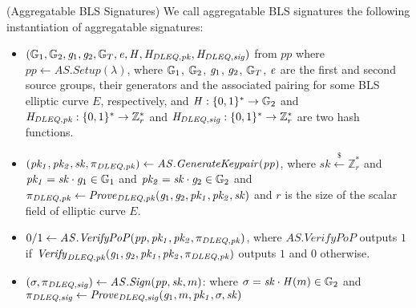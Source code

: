 \begin{construction}(Aggregatable BLS Signatures) We call aggregatable BLS signatures the following instantiation of aggregatable signatures:
\label{insta_bls}
\begin{itemize}
\item $(\mathbb{G}_{1}, \mathbb{G}_{2},  \mathit{g}_{1}, \mathit{g}_{2}, \mathbb{G}_{T}, \mathit{e}, \mathit{H}, \mathit{H}_{\mathit{DLEQ}, \mathit{pk}}, \mathit{H}_{\mathit{DLEQ}, \mathit{sig}})$ from $\mathit{pp}$ where 
$\mathit{pp} \leftarrow  \mathit{AS.Setup}(\lambda)$, 
where $\mathbb{G}_{1}$, $\mathbb{G}_{2}$,  $\mathit{g}_{1}$, $\mathit{g}_{2}$, $\mathbb{G}_{T}$, $\mathit{e}$ are the first and second source groups, their generators and the 
associated pairing for some BLS elliptic curve $E$, respectively,  %
and $\mathit{H}: \{0,1\}^* \rightarrow \mathbb{G}_{2}$ and $\mathit{H}_{\mathit{DLEQ}, \mathit{pk}}: \{0,1\}^* \rightarrow \mathbb{Z}_r^*$ and $\mathit{H}_{\mathit{DLEQ}, \mathit{sig}}: \{0,1\}^* \rightarrow \mathbb{Z}_r^*$
are two hash functions. 

\item $(\mathit{pk_1}, \mathit{pk_2}, \mathit{sk}, \pi_{\mathit{DLEQ}, \mathit{pk}}) \leftarrow \mathit{AS.GenerateKeypair}(\mathit{pp})$, 
where $\mathit{sk} \xleftarrow{\$} \mathbb{Z}_{r}^{*}$ and $\mathit{pk_1} = \mathit{sk} \cdot \mathit{g}_{1} \in \mathbb{G}_{1}$ 
and $\mathit{pk_2} = \mathit{sk} \cdot \mathit{g}_{2} \in \mathbb{G}_{2}$ 
and \\ $\pi_{\mathit{DLEQ}, \mathit{pk}} \leftarrow \mathit{Prove}_{\mathit{DLEQ}, \mathit{pk}}(\mathit{g}_{1}, \mathit{g}_{2}, \mathit{pk_1}, \mathit{pk_2}, \mathit{sk})$ 
and $r$ is the size of the scalar field of elliptic curve $E$. 

\item $0/1 \leftarrow \mathit{AS.VerifyPoP}(\mathit{pp}, \mathit{pk_1}, \mathit{pk_2}, \pi_{\mathit{DLEQ}, \mathit{pk}})$, where $\mathit{AS.VerifyPoP}$ outputs $1$ if 
$\mathit{Verify}_{\mathit{DLEQ}, \mathit{pk}}(\mathit{g}_{1}, \mathit{g}_{2}, \mathit{pk_1}, \mathit{pk_2}, \pi_{\mathit{DLEQ}, \mathit{pk}})$ outputs $1$ and $0$ otherwise.

\item $(\sigma, \pi_{\mathit{DLEQ}, \mathit{sig}}) \leftarrow \mathit{AS.Sign}(\mathit{pp}, \mathit{sk}, m)$: 
where $\sigma = \mathit{sk} \cdot \mathit{H}(m) \in \mathbb{G}_{2}$ and $ \pi_{\mathit{DLEQ}, \mathit{sig}} \leftarrow \mathit{Prove}_{\mathit{DLEQ}, \mathit{sig}}(\mathit{g}_{1}, m, \mathit{pk_1}, \sigma, \mathit{sk})$


\end{itemize}
\end{construction}
